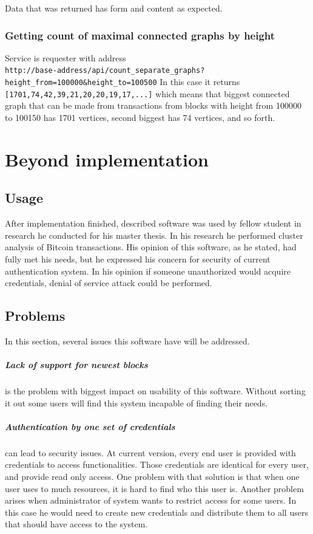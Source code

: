 \documentclass[12pt, en, eng, oneside]{mgr}
\begin{document}
Data that was returned has form and content as expected. 

\subsection{Getting count of maximal connected graphs by height}
Service is requester with address
\\ \verb|http://base-address/api/count_separate_graphs?height_from=100000&height_to=100500|
In this case it returns \texttt{[1701,74,42,39,21,20,20,19,17,...]} which means that biggest connected graph that can be made from transactions from blocks with height from 100000 to 100150 has 1701 vertices, second biggest has 74 vertices, and so forth.


\chapter{Beyond implementation}

\section{Usage}
After implementation finished, described software was used by fellow student in research he conducted for his master thesis. In his research he performed cluster analysis of Bitcoin transactions. His opinion of this software, as he stated, had fully met his needs, but he expressed his concern for security of current authentication system. In his opinion if someone unauthorized would acquire credentials, denial of service attack could be performed.

\section{Problems}
In this section, several issues this software have will be addressed.

\paragraph{Lack of support for newest blocks} is the problem with biggest impact on usability of this software. Without sorting it out some users will find this system incapable of finding their needs. 

\paragraph{Authentication by one set of credentials} can lead to security issues. At current version, every end user is provided with credentials to access functionalities. Those credentials are identical for every user, and provide read only access. One problem with that solution is that when one user uses to much resources, it is hard to find who this user is. Another problem arises when administrator of system wants to restrict access for some users. In this case he would need to create new credentials and distribute them to all users that should have access to the system.
\end{document}
